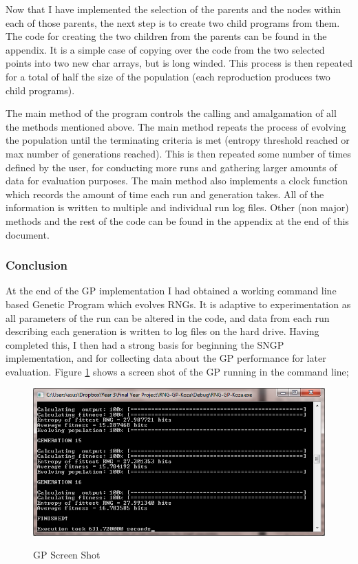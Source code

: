 \documentclass[a4paper,10.5pt]{article}
\begin{document}
Now that I have implemented the selection of the parents and the nodes within each of those parents, the next step is to create two child programs from them.
The code for creating the two children from the parents can be found in the appendix. It is a simple case of copying over the code from the two selected points into two new char arrays, but is long winded. This process is then repeated for a total of half the size of the population (each reproduction produces two child programs).

The main method of the program controls the calling and amalgamation of all the methods mentioned above. The main method repeats the process of evolving the population until the terminating criteria is met (entropy threshold reached or max number of generations reached). This is then repeated some number of times defined by the user, for conducting more runs and gathering larger amounts of data for evaluation purposes. The main method also implements a clock function which records the amount of time each run and generation takes. All of the information is written to multiple and individual run log files. Other (non major) methods and the rest of the code can be found in the appendix at the end of this document. 



\subsubsection{Conclusion}
At the end of the GP implementation I had obtained a working command line based Genetic Program which evolves RNGs. It is adaptive to experimentation as all parameters of the run can be altered in the code, and data from each run describing each generation is written to log files on the hard drive. Having completed this, I then had a strong basis for beginning the SNGP implementation, and for collecting data about the GP performance for later evaluation. Figure \ref{gpss} shows a screen shot of the GP running in the command line;

\begin{figure}[H]
\centering
\caption{GP Screen Shot}
\includegraphics[scale = 0.75]{gp-ss.png}
\label{gpss}
\end{figure}
\end{document}
